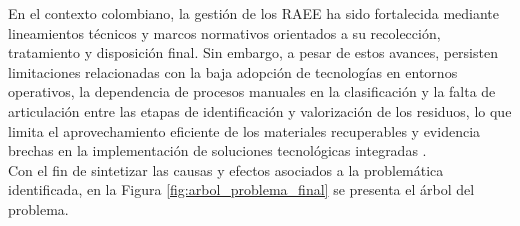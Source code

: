 En el contexto colombiano, la gestión de los RAEE ha sido fortalecida mediante lineamientos técnicos y marcos normativos orientados a su recolección, tratamiento y disposición final. Sin embargo, a pesar de estos avances, persisten limitaciones relacionadas con la baja adopción de tecnologías en entornos operativos, la dependencia de procesos manuales en la clasificación y la falta de articulación entre las etapas de identificación y valorización de los residuos, lo que limita el aprovechamiento eficiente de los materiales recuperables y evidencia brechas en la implementación de soluciones tecnológicas integradas \cite{guiaRAEEColombia2023}.\\

Con el fin de sintetizar las causas y efectos asociados a la problemática identificada, en la Figura \ref{fig:arbol_problema_final} se presenta el árbol del problema.\\

